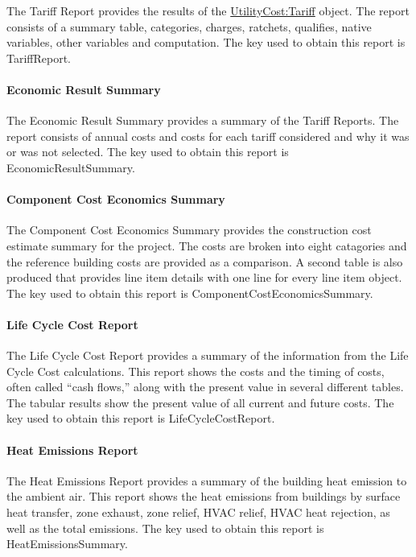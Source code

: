 The Tariff Report provides the results of the \hyperref[utilitycosttariff]{UtilityCost:Tariff} object. The report consists of a summary table, categories, charges, ratchets, qualifies, native variables, other variables and computation. The key used to obtain this report is TariffReport.

\paragraph{Economic Result Summary}\label{EconomicResultSummary}

The Economic Result Summary provides a summary of the Tariff Reports. The report consists of annual costs and costs for each tariff considered and why it was or was not selected. The key used to obtain this report is EconomicResultSummary.

\paragraph{Component Cost Economics Summary}\label{component-cost-economics-summary}

The Component Cost Economics Summary provides the construction cost estimate summary for the project. The costs are broken into eight catagories and the reference building costs are provided as a comparison. A second table is also produced that provides line item details with one line for every line item object. The key used to obtain this report is ComponentCostEconomicsSummary.

\paragraph{Life Cycle Cost Report}\label{LifeCycleCostReport}

The Life Cycle Cost Report provides a summary of the information from the Life Cycle Cost calculations.  This report shows the costs and the timing of costs, often called “cash flows,” along with the present value in several different tables. The tabular results show the present value of all current and future costs. The key used to obtain this report is LifeCycleCostReport.

\paragraph{Heat Emissions Report}\label{HeatEmissionsReport}

The Heat Emissions Report provides a summary of the building heat emission to the ambient air. This report shows the heat emissions from buildings by surface heat transfer, zone exhaust, zone relief, HVAC relief, HVAC heat rejection, as well as the total emissions. The key used to obtain this report is HeatEmissionsSummary.

